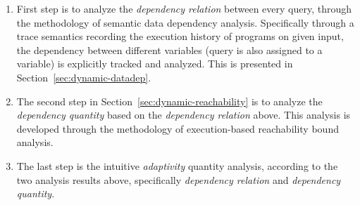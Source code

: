 \begin{enumerate}
   \item First step is to analyze the \emph{dependency relation} between every query, 
   through the methodology of semantic data dependency analysis.
   Specifically through a trace semantics recording the execution history of programs on given input,
   the dependency between different variables (query is also assigned to a variable) is explicitly tracked and 
   analyzed. This is presented in Section~\ref{sec:dynamic-datadep}.
   \item The second step in Section~\ref{sec:dynamic-reachability} is to analyze the \emph{dependency quantity} 
  based on the \emph{dependency relation} above.
  This analysis is developed through the methodology of execution-based reachability bound analysis.
   \item The last step is the intuitive \emph{adaptivity} quantity analysis, 
   according to the two analysis results above, specifically \emph{dependency relation} and \emph{dependency quantity}.

\end{enumerate}
